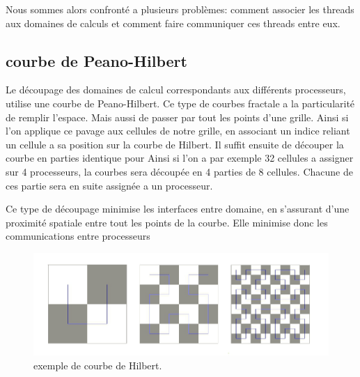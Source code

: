 Nous sommes alors confronté a plusieurs problèmes: comment associer les threads aux domaines de calculs  et comment faire communiquer ces threads entre eux.

\subsection{courbe de Peano-Hilbert}



Le découpage des domaines de calcul correspondants aux différents processeurs,  utilise une courbe de Peano-Hilbert.
Ce type de courbes fractale a la particularité de remplir l'espace.
Mais aussi de passer par tout les points d'une grille.
Ainsi si l'on applique ce pavage aux cellules de notre grille, en associant un indice reliant un cellule a sa position sur la courbe de Hilbert.
Il suffit ensuite de découper la courbe en parties identique  pour 
Ainsi si l'on a par exemple  32 cellules a assigner sur 4 processeurs, la courbes sera découpée en 4 parties de 8 cellules.
Chacune de ces partie sera en suite assignée a un processeur.

Ce type de découpage minimise les interfaces entre domaine, en s'assurant d'une proximité spatiale entre tout les points de la courbe.
Elle minimise donc les communications entre processeurs

\begin{figure}[bth]
        \includegraphics[width=.95\linewidth]{img/02/courbe_Hilbert.jpeg} 
        \caption{exemple de courbe de Hilbert. 
}
 		\label{fig:hilbert}
\end{figure}



